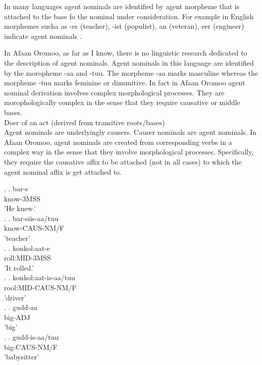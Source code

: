 \documentclass[11pt,a4paper]{article}
\begin{document}
In many languages agent nominals are identified by agent morpheme that is attached to the base fo the nominal under consideration. For example in English morphemes sucha as -er (teacher), -ist (populist), an (veteran), eer (engineer) indicate agent nominals \cite[p-186]{huyghe2020s}.

In Afaan Oromoo, as far as I know, there is no linguistic research dedicated to the description of agent nominals. Agent nominals in this language are identified by the moropheme -aa and -tuu. The morpheme -aa marks masculine whereas the morpheme -tuu marks feminine or dimunitive. In fact in Afaan Oromoo agent nominal derivation involves complex morphological processes. They are morophologically complex in the sense that they require causative or middle bases. \\

Doer of an act (derived from transitive roots/bases)\\

Agent nominals are underlyingly causers. Causer nominals are agent nominals. In Afaan Oromoo, agent nominals are created from corresponding verbs in a complex way in the sense that they involve morphological processes. Specifically, they require the causative affix to be attached (not in all cases) to which the agent nominal affix is get attached to. 

\ex.
\ag.
bar-e \\
know-3MSS\\
'He knew.'\\

\ex.
\ag.
bar-siis-aa/tuu \\
know-CAUS-NM/F\\
'teacher'\\

\ex.
\ag.
konkol:aat-e \\
roll:MID-3MSS\\
'It rolled.'\\

\ex.
\ag.
konkol:aat-is-aa/tuu \\
rool:MID-CAUS-NM/F\\
'driver'\\

\ex.
\ag.
gudd-aa \\
big-ADJ\\
'big'\\

\ex.
\ag.
gudd-is-aa/tuu \\
big-CAUS-NM/F\\
'babysitter'\\
\end{document}
